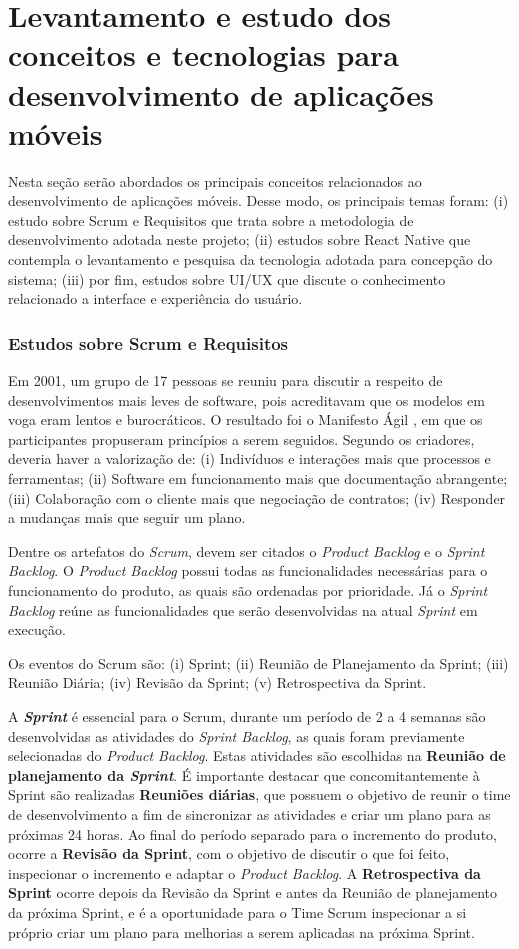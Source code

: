 \section{Levantamento e estudo dos conceitos e tecnologias para desenvolvimento de aplicações móveis}

Nesta seção serão abordados os principais conceitos relacionados ao desenvolvimento de aplicações móveis. Desse modo, os principais temas foram: (i) estudo sobre Scrum e Requisitos que trata sobre a metodologia de desenvolvimento adotada neste projeto; (ii) estudos sobre React Native que contempla o levantamento e pesquisa da tecnologia adotada para concepção do sistema; (iii) por fim, estudos sobre UI/UX que discute o conhecimento relacionado a interface e experiência do usuário.

\subsubsection{Estudos sobre Scrum e Requisitos} 
Em 2001, um grupo de 17 pessoas se reuniu para discutir a respeito de desenvolvimentos mais leves de software, pois acreditavam que os modelos em voga eram lentos e burocráticos. O resultado foi o Manifesto Ágil \citep{agileManifesto}, em que os participantes propuseram princípios a serem seguidos. Segundo os criadores, deveria haver a valorização de: (i) Indivíduos e interações mais que processos e ferramentas; (ii) Software em funcionamento mais que documentação abrangente; (iii) Colaboração com o cliente mais que negociação de contratos; (iv) Responder a mudanças mais que seguir um plano.

Dentre os artefatos do \textit{Scrum}, devem ser citados o \textit{Product Backlog} e o \textit{Sprint Backlog}. O \textit{Product Backlog} possui todas as funcionalidades necessárias para o funcionamento do produto, as quais são ordenadas por prioridade. Já o \textit{Sprint Backlog} reúne as funcionalidades que serão desenvolvidas na atual \textit{Sprint} em execução.

Os eventos do Scrum são: (i) Sprint; (ii) Reunião de Planejamento da Sprint; (iii) Reunião Diária; (iv) Revisão da Sprint; (v) Retrospectiva da Sprint.

A \textbf{\textit{Sprint}} é essencial para o Scrum, durante um período de 2 a 4 semanas são desenvolvidas as atividades do \textit{Sprint Backlog}, as quais foram previamente selecionadas do \textit{Product Backlog}. Estas atividades são escolhidas na \textbf{Reunião de planejamento da \textit{Sprint}}. É importante destacar que concomitantemente à Sprint são realizadas \textbf{Reuniões diárias}, que possuem o objetivo de reunir o time de desenvolvimento a fim de sincronizar as atividades e criar um plano para as próximas 24 horas. Ao final do período separado para o incremento do produto, ocorre a \textbf{Revisão da Sprint}, com o objetivo de discutir o que foi feito, inspecionar o incremento e adaptar o \textit{Product Backlog}. A \textbf{Retrospectiva da Sprint} ocorre depois da Revisão da Sprint e antes da Reunião de planejamento da próxima Sprint, e é a oportunidade para o Time Scrum inspecionar a si próprio criar um plano para melhorias a serem aplicadas na próxima Sprint.

